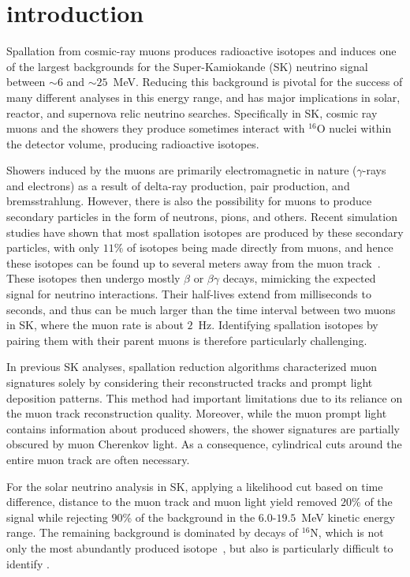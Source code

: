 \section{introduction}
Spallation from cosmic-ray muons produces radioactive isotopes and induces one of the largest backgrounds for the Super-Kamiokande (SK) neutrino signal between ${\sim}6$ and ${\sim}25$~MeV. Reducing this background is pivotal for the success of many different analyses in this energy range, and has major implications in solar, reactor, and supernova relic neutrino searches. Specifically in SK, cosmic ray muons and the showers they produce sometimes interact with $^{16}\mbox{O}$ nuclei within the detector volume, producing radioactive isotopes. 

Showers induced by the muons are primarily electromagnetic in nature ($\gamma$-rays and electrons) as a result of delta-ray production, pair production, and bremsstrahlung. However, there is also the possibility for muons to produce secondary particles in the form of neutrons, pions, and others. Recent simulation studies have shown that most spallation isotopes are produced by these secondary particles, with only $11\%$ of isotopes being made directly from muons, and hence these isotopes can be found up to several meters away from the muon track~\cite{BLi_1,BLi_2,BLi_3}. These isotopes then undergo mostly $\beta$ or $\beta\gamma$ decays, mimicking the expected signal for neutrino interactions. Their half-lives extend from milliseconds to seconds, and thus can be much larger than the time interval between two muons in SK, where the muon rate is about $2$~Hz. Identifying spallation isotopes by pairing them with their parent muons is therefore particularly challenging.

In previous SK analyses, spallation reduction algorithms characterized muon signatures solely by considering their reconstructed tracks and prompt light deposition patterns. This method had important limitations due to its reliance on the muon track reconstruction quality. Moreover, while the muon prompt light contains information about produced showers, the shower signatures are partially obscured by muon Cherenkov light. As a consequence, cylindrical cuts around the entire muon track are often necessary.

For the solar neutrino analysis in SK, applying a likelihood cut based on time difference, distance to the muon track and muon light yield  removed $20\%$ of the signal while rejecting $90$\% of the background in the $6.0$-$19.5$~MeV kinetic energy range. The remaining background is dominated by decays of $^{16}\mbox{N}$, which is not only the most abundantly produced isotope~\cite{SKspall_zhang}, but also is particularly difficult to identify \cite{skivsolar}. 

